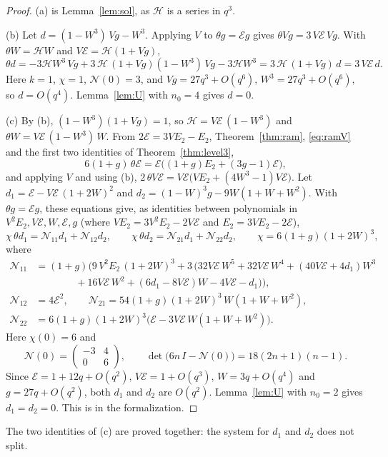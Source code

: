 \documentclass[11pt]{amsart}
\theoremstyle{definition}
\numberwithin{equation}{section}
\newcommand{\cE}{\mathcal{E}}
\begin{document}
\begin{proof}
(a) is Lemma~\ref{lem:sol}, as $\mathcal H$ is a series in $q^3$.

(b) Let $d=(1-W^3)\,Vg-W^3$. Applying $V$ to $\theta g=\cE g$ gives $\theta Vg=3\,V\cE\,Vg$. With $\theta W=\mathcal HW$ and $V\cE=\mathcal H(1+Vg)$,
\[
\theta d=-3\mathcal HW^3\,Vg+3\,\mathcal H\,(1+Vg)(1-W^3)\,Vg-3\mathcal HW^3=3\,\mathcal H\,(1+Vg)\,d=3\,V\cE\,d .
\]
Here $k=1$, $\chi=1$, $\mathcal N(0)=3$, and $Vg=27q^3+O(q^6)$, $W^3=27q^3+O(q^6)$, so $d=O(q^4)$. Lemma~\ref{lem:U} with $n_0=4$ gives $d=0$.

(c) By (b), $(1-W^3)(1+Vg)=1$, so $\mathcal H=V\cE\,(1-W^3)$ and $\theta W=V\cE\,(1-W^3)\,W$. From $2\cE=3VE_2-E_2$, Theorem~\ref{thm:ram}, \eqref{eq:ramV} and the first two identities of Theorem~\ref{thm:level3},
\[
6(1+g)\,\theta\cE=\cE\bigl((1+g)E_2+(3g-1)\cE\bigr),
\]
and applying $V$ and using (b), $2\,\theta V\cE=V\cE\bigl(VE_2+(4W^3-1)V\cE\bigr)$. Let $d_1=\cE-V\cE\,(1+2W)^2$ and $d_2=(1-W)^3g-9W(1+W+W^2)$. With $\theta g=\cE g$, these equations give, as identities between polynomials in $V^2E_2,V\cE,W,\cE,g$ (where $VE_2=3V^2E_2-2V\cE$ and $E_2=3VE_2-2\cE$),
\[
\chi\,\theta d_1=\mathcal N_{11}d_1+\mathcal N_{12}d_2,\qquad \chi\,\theta d_2=\mathcal N_{21}d_1+\mathcal N_{22}d_2,\qquad \chi=6(1+g)(1+2W)^3,
\]
where
\begin{align*}
\mathcal N_{11}&=(1+g)\bigl(9\,V^2E_2\,(1+2W)^3+3\,\bigl(32V\cE\,W^5+32V\cE\,W^4+(40V\cE+4d_1)W^3\\
&\qquad\qquad+16V\cE\,W^2+(6d_1-8V\cE)W-4V\cE-d_1\bigr)\bigr),\\
\mathcal N_{12}&=4\cE^2,\qquad \mathcal N_{21}=54(1+g)(1+2W)^3\,W(1+W+W^2),\\
\mathcal N_{22}&=6(1+g)(1+2W)^3\bigl(\cE-3V\cE\,W(1+W+W^2)\bigr).
\end{align*}
Here $\chi(0)=6$ and
\[
\mathcal N(0)=\begin{pmatrix}-3&4\\0&6\end{pmatrix},\qquad \det\bigl(6n\,I-\mathcal N(0)\bigr)=18(2n+1)(n-1).
\]
Since $\cE=1+12q+O(q^2)$, $V\cE=1+O(q^3)$, $W=3q+O(q^4)$ and $g=27q+O(q^2)$, both $d_1$ and $d_2$ are $O(q^2)$. Lemma~\ref{lem:U} with $n_0=2$ gives $d_1=d_2=0$. This is  in the formalization.
\end{proof}

The two identities of (c) are proved together: the system for $d_1$ and $d_2$ does not split.
\end{document}
